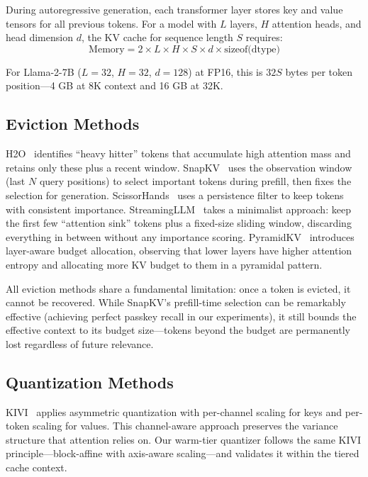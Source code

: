 \documentclass[11pt,a4paper]{article}
\begin{document}
During autoregressive generation, each transformer layer stores key and value tensors for all previous tokens. For a model with $L$ layers, $H$ attention heads, and head dimension $d$, the KV cache for sequence length $S$ requires:
\begin{equation}
    \text{Memory} = 2 \times L \times H \times S \times d \times \text{sizeof(dtype)}
\end{equation}

For Llama-2-7B ($L=32$, $H=32$, $d=128$) at FP16, this is $32S$ bytes per token position---4 GB at 8K context and 16 GB at 32K.

\subsection{Eviction Methods}

H2O~\cite{h2o} identifies ``heavy hitter'' tokens that accumulate high attention mass and retains only these plus a recent window. SnapKV~\cite{snapkv} uses the observation window (last $N$ query positions) to select important tokens during prefill, then fixes the selection for generation. ScissorHands~\cite{scissorhands} uses a persistence filter to keep tokens with consistent importance. StreamingLLM~\cite{streamingllm} takes a minimalist approach: keep the first few ``attention sink'' tokens plus a fixed-size sliding window, discarding everything in between without any importance scoring. PyramidKV~\cite{pyramidkv} introduces layer-aware budget allocation, observing that lower layers have higher attention entropy and allocating more KV budget to them in a pyramidal pattern.

All eviction methods share a fundamental limitation: once a token is evicted, it cannot be recovered. While SnapKV's prefill-time selection can be remarkably effective (achieving perfect passkey recall in our experiments), it still bounds the effective context to its budget size---tokens beyond the budget are permanently lost regardless of future relevance.

\subsection{Quantization Methods}

KIVI~\cite{kivi} applies asymmetric quantization with per-channel scaling for keys and per-token scaling for values. This channel-aware approach preserves the variance structure that attention relies on. Our warm-tier quantizer follows the same KIVI principle---block-affine with axis-aware scaling---and validates it within the tiered cache context.
\end{document}
